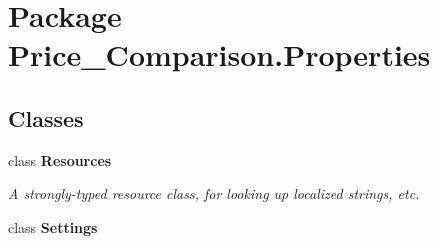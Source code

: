 \hypertarget{namespace_price___comparison_1_1_properties}{\section{Package Price\-\_\-\-Comparison.\-Properties}
\label{namespace_price___comparison_1_1_properties}
}
\subsection*{Classes}
\begin{DoxyCompactItemize}
\item 
class {\bfseries Resources}
\begin{DoxyCompactList}\small\item\em A strongly-\/typed resource class, for looking up localized strings, etc. \end{DoxyCompactList}\item 
class {\bfseries Settings}
\end{DoxyCompactItemize}
